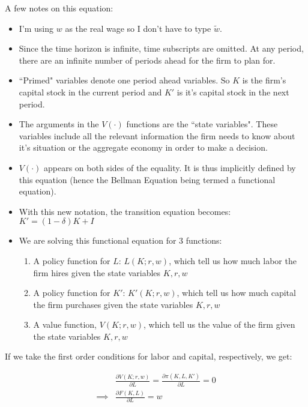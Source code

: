\documentclass[letterpaper,12pt]{article}
\theoremstyle{definition}
\begin{document}
\begin{spacing}{1.5}
A few notes on this equation:
\begin{itemize}
\item I'm using $w$ as the real wage so I don't have to type $\tilde{w}$.
\item Since the time horizon is infinite, time subscripts are omitted.  At any period, there are an infinite number of periods ahead for the firm to plan for.
\item ``Primed" variables denote one period ahead variables.  So $K$ is the firm's capital stock in the current period and $K'$ is it's capital stock in the next period.
\item The arguments in the $V(\cdot)$ functions are the ``state variables".  These variables include all the relevant information the firm needs to know about it's situation or the aggregate economy in order to make a decision.  
\item $V(\cdot)$ appears on both sides of the equality.  It is thus implicitly defined by this equation (hence the Bellman Equation being termed a functional equation).
\item With this new notation, the transition equation becomes: $K' = (1-\delta)K + I$
\item We are solving this functional equation for 3 functions:
	\begin{enumerate}
	\item A policy function for $L$: $L(K;r,w)$, which tell us how much labor the firm hires given the state variables $K,r,w$
	\item A policy function for $K'$: $K'(K;r,w)$, which tell us how much capital the firm purchases given the state variables $K,r,w$
	\item A value function, $V(K;r,w)$, which tell us the value of the firm given the state variables $K,r,w$
	\end{enumerate}
\end{itemize}

If we take the first order conditions for labor and capital, respectively, we get:

\begin{equation}
\label{eqn:bellman_foc_l}
\begin{split}
&\frac{\partial V(K;r,w)}{\partial L} = \frac{\partial \pi(K,L,K')}{\partial L} = 0 \\
\implies & \frac{\partial F(K,L)}{\partial L} = w \\
\end{split}
\end{equation}


\end{spacing}
\end{document}
